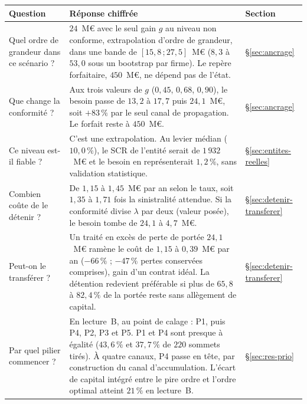 \begin{center}\footnotesize
\renewcommand{\arraystretch}{1.25}
\begin{tabular}{@{}>{\raggedright\arraybackslash}p{4.0cm} >{\raggedright\arraybackslash}p{7.6cm} >{\raggedright\arraybackslash}p{2.2cm}@{}}
\toprule
\textbf{Question} & \textbf{Réponse chiffrée} & \textbf{Section} \\
\midrule
Quel ordre de grandeur dans ce scénario ? & $24$~M\euro{} avec le seul gain $g$ au niveau non conforme, extrapolation d'ordre de grandeur, dans une bande de
$[15{,}8\,;27{,}5]$~M\euro{} ($8{,}3$ à $53{,}0$ sous un bootstrap par firme). Le repère forfaitaire, $450$~M\euro, ne dépend pas de l'état. &
\S\ref{sec:ancrage} \\
Que change la conformité ? & Aux trois valeurs de $g$ ($0{,}45$, $0{,}68$, $0{,}90$), le besoin passe de $13{,}2$ à
$17{,}7$ puis $24{,}1$~M\euro, soit $+83\,\%$ par le seul canal de propagation. Le forfait reste à $450$~M\euro. & \S\ref{sec:ancrage} \\
Ce niveau est-il fiable ? & C'est une extrapolation. Au levier médian
($10{,}0\,\%$), le SCR de l'entité serait de $1\,932$~M\euro{} et le besoin en représenterait $1{,}2\,\%$, sans validation statistique. &
\S\ref{sec:entites-reelles} \\
Combien coûte de le détenir ? & De $1{,}15$ à $1{,}45$~M\euro{} par an selon le taux, soit $1{,}35$ à $1{,}71$ fois
la sinistralité attendue. Si la conformité divise $\lambda$ par deux (valeur posée), le besoin tombe de $24{,}1$ à $4{,}7$~M\euro. &
\S\ref{sec:detenir-transferer} \\
Peut-on le transférer ? & Un traité en excès de perte de portée $24{,}1$~M\euro{} ramène le coût de $1{,}15$ à
$0{,}39$~M\euro{} par an ($-66\,\%$ ; $-47\,\%$ pertes conservées comprises), gain d'un contrat idéal. La détention redevient préférable si plus de $65{,}8$ à $82{,}4\,\%$ de
la portée reste sans allègement de capital. & \S\ref{sec:detenir-transferer} \\
Par quel pilier commencer ? & En lecture~B, au point de calage : P1, puis P4, P2, P3 et P5. P1 et P4 sont presque à égalité ($43{,}6\,\%$ et $37{,}7\,\%$ de $220$ sommets tirés). À quatre canaux, P4 passe en tête, par construction du canal d'accumulation. L'écart de capital intégré entre le pire ordre et
l'ordre optimal atteint $21\,\%$ en lecture~B. & \S\ref{sec:res-prio} \\
\bottomrule
\end{tabular}
\end{center}

